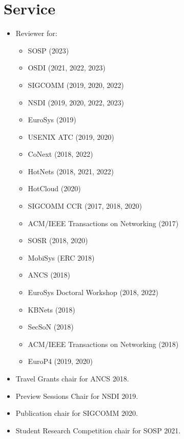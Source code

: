 \documentclass[11pt,letterpaper,sans]{moderncv}        %
\begin{document}
\section{Service}
    \begin{itemize}
        \item Reviewer for:
            \begin{itemize}
                \item SOSP (2023)
                \item OSDI (2021, 2022, 2023)
                \item SIGCOMM (2019, 2020, 2022)
                \item NSDI (2019, 2020, 2022, 2023)
                \item EuroSys (2019)
                \item USENIX ATC (2019, 2020)
                \item CoNext (2018, 2022)
                \item HotNets (2018, 2021, 2022)
                \item HotCloud (2020)
                \item SIGCOMM CCR (2017, 2018, 2020)
                \item ACM/IEEE Transactions on Networking (2017)
                \item SOSR (2018, 2020)
                \item MobiSys (ERC 2018)
                \item ANCS (2018)
                \item EuroSys Doctoral Workshop (2018, 2022)
                \item KBNets (2018)
                \item SecSoN (2018)
                \item ACM/IEEE Transactions on Networking (2018)
                \item EuroP4 (2019, 2020)
            \end{itemize}
        \item Travel Grants chair for ANCS 2018.
        \item Preview Sessions Chair for NSDI 2019.
        \item Publication chair for SIGCOMM 2020. 
        \item Student Research Competition chair for SOSP 2021. 
    \end{itemize}
\end{document}
